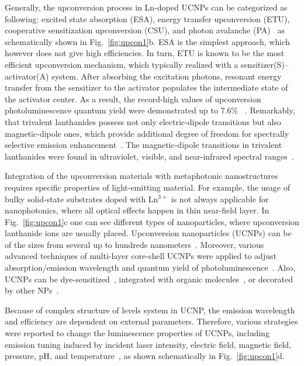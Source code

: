\documentclass[journal=chreay,manuscript=review]{achemso}
\begin{document}
Generally, the upconversion process in Ln-doped UCNPs can be categorized as following:  excited state absorption (ESA), energy transfer upconversion (ETU), cooperative sensitization upconversion (CSU), and photon avalanche (PA)~\cite{bunzli2005taking, dong2013basic, wu2019expanding} as schematically shown in Fig.~\ref{fig:upcon1}b. ESA is the simplest approach, which however does not give high efficiencies. In turn, ETU is
known to be the most efficient upconversion mechanism, which typically
realized with a sensitizer(S)–activator(A) system. After absorbing the
excitation photons, resonant energy transfer from the sensitizer
to the activator populates the intermediate state of the activator center. As a result, the record-high values of upconversion photoluminescence quantum yield were demonstrated up to 7.6\% ~\cite{huang2014lanthanide}.
Remarkably, that trivalent lanthanides possess not only electric-dipole transitions but also magnetic-dipole ones, which provide additional degree of freedom for spectrally selective emission enhancement~\cite{baranov2017modifying}. The magnetic-dipole transitions in trivalent lanthanides were found in ultraviolet, visible, and near-infrared spectral ranges~\cite{dodson2012magnetic}. 

Integration of the upconversion materials with metaphotonic nanostructures requires specific properties of light-emitting material. For example, the usage of bulky solid-state substrates doped with Ln$^{3+}$ is not always applicable for nanophotonics, where all optical effects happen in thin near-field layer. 
In Fig.~\ref{fig:upcon1}c one can see different types of nanoparticles, where upconversion lanthanide ions are usually placed. Upconversion nanoparticles (UCNPs) can be of the sizes from several up to hundreds nanometers~\cite{zhou2015controlling, wen2018advances}. Moreover, various advanced techniques of multi-layer core-shell UCNPs were applied to adjust absorption/emission wavelength and quantum yield of photoluminescence~\cite{fan2019exploiting}. Also, UCNPs can be dye-sensitized~\cite{wang2017dye}, integrated with organic molecules~\cite{han2020lanthanide}, or decorated by other NPs~\cite{clarke2018large}. 

Because of complex structure of levels system in UCNP, the emission wavelength and efficiency are dependent on external parameters. Therefore, various strategies were reported to change the luminescence properties of UCNPs, including emission tuning induced by incident laser intensity, electric field, magnetic field, pressure, pH, and temperature~\cite{gonzalez2015upconversion, wu2019expanding, zhou2020single}, as shown schematically in Fig.~\ref{fig:upcon1}d.
\end{document}
